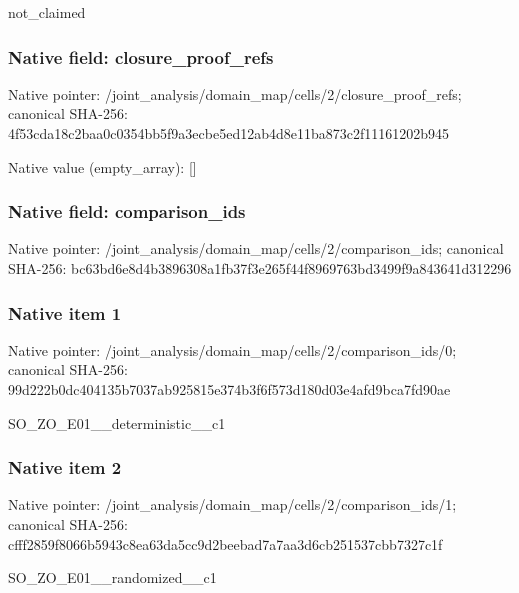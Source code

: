 \documentclass[10pt,a4paper]{article}
\begin{document}
\begingroup\raggedright\sloppy not\_\allowbreak{}claimed\par\endgroup

\subsubsection{Native field: closure\_\allowbreak{}proof\_\allowbreak{}refs}
Native pointer: /joint\_\allowbreak{}analysis/domain\_\allowbreak{}map/cells/2/closure\_\allowbreak{}proof\_\allowbreak{}refs; canonical SHA-256: 4f53cda18c2baa0c0354bb5f9a3ecbe5ed12ab4d8e11ba873c2f11161202b945

Native value (empty\_\allowbreak{}array): []

\subsubsection{Native field: comparison\_\allowbreak{}ids}
Native pointer: /joint\_\allowbreak{}analysis/domain\_\allowbreak{}map/cells/2/comparison\_\allowbreak{}ids; canonical SHA-256: bc63bd6e8d4b3896308a1fb37f3e265f44f8969763bd3499f9a843641d312296

\subsubsection{Native item 1}
Native pointer: /joint\_\allowbreak{}analysis/domain\_\allowbreak{}map/cells/2/comparison\_\allowbreak{}ids/0; canonical SHA-256: 99d222b0dc404135b7037ab925815e374b3f6f573d180d03e4afd9bca7fd90ae

\begingroup\raggedright\sloppy SO\_\allowbreak{}ZO\_\allowbreak{}E01\_\allowbreak{}\_\allowbreak{}deterministic\_\allowbreak{}\_\allowbreak{}c1\par\endgroup

\subsubsection{Native item 2}
Native pointer: /joint\_\allowbreak{}analysis/domain\_\allowbreak{}map/cells/2/comparison\_\allowbreak{}ids/1; canonical SHA-256: cfff2859f8066b5943c8ea63da5cc9d2beebad7a7aa3d6cb251537cbb7327c1f

\begingroup\raggedright\sloppy SO\_\allowbreak{}ZO\_\allowbreak{}E01\_\allowbreak{}\_\allowbreak{}randomized\_\allowbreak{}\_\allowbreak{}c1\par\endgroup
\end{document}
